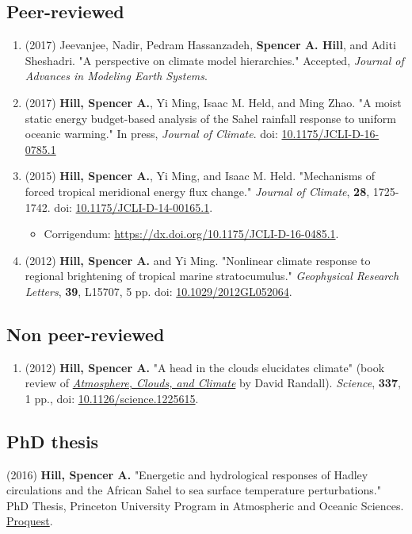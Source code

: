 \documentclass[12pt,letterpaper]{shillcv}
\begin{document}
\subsection*{Peer-reviewed}
\label{sec:org8f43864}
\begin{enumerate}
\item (2017) Jeevanjee, Nadir, Pedram Hassanzadeh, \textbf{Spencer A. Hill}, and Aditi
Sheshadri.  "A perspective on climate model hierarchies."  Accepted, \emph{Journal
of Advances in Modeling Earth Systems}.
\item (2017) \textbf{Hill, Spencer A.}, Yi Ming, Isaac M. Held, and Ming Zhao.  "A moist
static energy budget-based analysis of the Sahel rainfall response to uniform
oceanic warming."  In press, \emph{Journal of Climate}.  doi: \href{https://doi.org/10.1175/JCLI-D-16-0785.1}{10.1175/JCLI-D-16-0785.1}
\item (2015) \textbf{Hill, Spencer A.}, Yi Ming, and Isaac M. Held. "Mechanisms of forced
tropical meridional energy flux change."  \emph{Journal of Climate}, \textbf{28}, 1725-1742.
doi: \href{http://dx.doi.org/10.1175/JCLI-D-14-00165.1}{10.1175/JCLI-D-14-00165.1}.
\begin{itemize}
\item Corrigendum: \url{https://dx.doi.org/10.1175/JCLI-D-16-0485.1}.
\end{itemize}
\item (2012) \textbf{Hill, Spencer A.} and Yi Ming. "Nonlinear climate response to regional
brightening of tropical marine stratocumulus."  \emph{Geophysical Research Letters},
\textbf{39}, L15707, 5 pp. doi:
\href{http://dx.doi.org/10.1029/2012GL052064}{10.1029/2012GL052064}.
\end{enumerate}
\subsection*{Non peer-reviewed}
\label{sec:org2edbb2d}
\begin{enumerate}
\item (2012) \textbf{Hill, Spencer A.} "A head in the clouds elucidates climate" (book
review of \href{http://press.princeton.edu/titles/9773.html}{\emph{Atmosphere, Clouds, and Climate}} by David Randall). \emph{Science}, \textbf{337},
1 pp., doi: \href{http://dx.doi.org/10.1126/science.1225615}{10.1126/science.1225615}.
\end{enumerate}
\subsection*{PhD thesis}
\label{sec:orgf605924}
(2016) \textbf{Hill, Spencer A.} "Energetic and hydrological responses of Hadley
circulations and the African Sahel to sea surface temperature perturbations."
PhD Thesis, Princeton University Program in Atmospheric and Oceanic Sciences.
\href{http://search.proquest.com.ezproxy.princeton.edu/pqdtglobal/docview/1831357756/abstract/522E2D42A8BF49C0PQ/1}{Proquest}.
\end{document}
